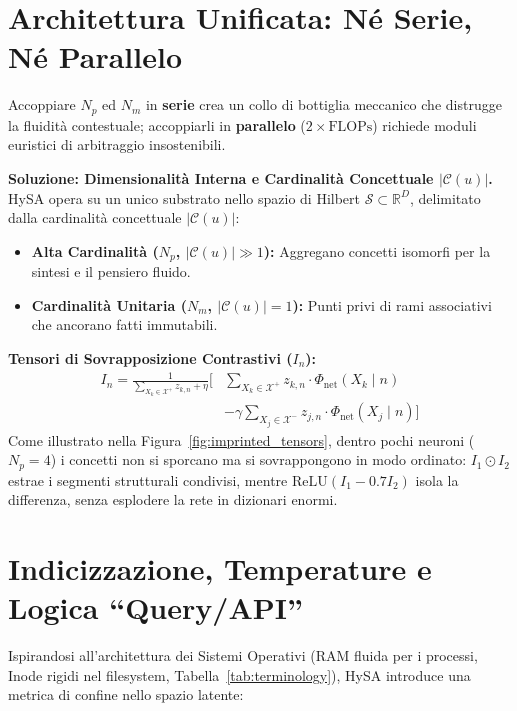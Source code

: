 \documentclass[10pt,twocolumn]{article}
\theoremstyle{definition}
\begin{document}
\section{Architettura Unificata: Né Serie, Né Parallelo}
Accoppiare $N_p$ ed $N_m$ in \textbf{serie} crea un collo di bottiglia meccanico che distrugge la fluidità contestuale; accoppiarli in \textbf{parallelo} ($2\times \mathrm{FLOPs}$) richiede moduli euristici di arbitraggio insostenibili.

\textbf{Soluzione: Dimensionalità Interna e Cardinalità Concettuale $|\mathcal{C}(u)|$.} HySA opera su un unico substrato nello spazio di Hilbert $\mathcal{S} \subset \mathbb{R}^D$, delimitato dalla cardinalità concettuale $|\mathcal{C}(u)|$:
\begin{itemize}[leftmargin=*, itemsep=1.5pt]
    \item \textbf{Alta Cardinalità ($N_p$, $|\mathcal{C}(u)| \gg 1$):} Aggregano concetti isomorfi per la sintesi e il pensiero fluido.
    \item \textbf{Cardinalità Unitaria ($N_m$, $|\mathcal{C}(u)|=1$):} Punti privi di rami associativi che ancorano fatti immutabili.
\end{itemize}

\textbf{Tensori di Sovrapposizione Contrastivi ($I_n$):}
\begin{equation}
\begin{aligned}
    I_n = \frac{1}{\sum_{X_k \in \mathcal{X}^+} z_{k,n} + \eta} \Bigg[ & \sum_{X_k \in \mathcal{X}^+} z_{k,n} \cdot \Phi_{\mathrm{net}}(X_k \mid n) \\
    & - \gamma \sum_{X_j \in \mathcal{X}^-} z_{j,n} \cdot \Phi_{\mathrm{net}}(X_j \mid n) \Bigg]
\end{aligned}
\end{equation}
Come illustrato nella Figura~\ref{fig:imprinted_tensors}, dentro pochi neuroni ($N_p=4$) i concetti non si sporcano ma si sovrappongono in modo ordinato: $I_1 \odot I_2$ estrae i segmenti strutturali condivisi, mentre $\mathrm{ReLU}(I_1 - 0.7 I_2)$ isola la differenza, senza esplodere la rete in dizionari enormi.

\section{Indicizzazione, Temperature e Logica ``Query/API''}
Ispirandosi all'architettura dei Sistemi Operativi (RAM fluida per i processi, Inode rigidi nel filesystem, Tabella~\ref{tab:terminology}), HySA introduce una metrica di confine nello spazio latente:
\end{document}
